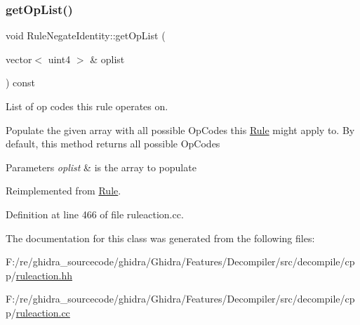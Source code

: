 \subsubsection{\texorpdfstring{getOpList()}{getOpList()}}
{\footnotesize\ttfamily void Rule\+Negate\+Identity\+::get\+Op\+List (\begin{DoxyParamCaption}\item[{vector$<$ uint4 $>$ \&}]{oplist }\end{DoxyParamCaption}) const\hspace{0.3cm}{\ttfamily [virtual]}}



List of op codes this rule operates on. 

Populate the given array with all possible Op\+Codes this \mbox{\hyperlink{class_rule}{Rule}} might apply to. By default, this method returns all possible Op\+Codes 
\begin{DoxyParams}{Parameters}
{\em oplist} & is the array to populate \\
\hline
\end{DoxyParams}


Reimplemented from \mbox{\hyperlink{class_rule_a4023bfc7825de0ab866790551856d10e}{Rule}}.



Definition at line 466 of file ruleaction.\+cc.



The documentation for this class was generated from the following files\+:\begin{DoxyCompactItemize}
\item 
F\+:/re/ghidra\+\_\+sourcecode/ghidra/\+Ghidra/\+Features/\+Decompiler/src/decompile/cpp/\mbox{\hyperlink{ruleaction_8hh}{ruleaction.\+hh}}\item 
F\+:/re/ghidra\+\_\+sourcecode/ghidra/\+Ghidra/\+Features/\+Decompiler/src/decompile/cpp/\mbox{\hyperlink{ruleaction_8cc}{ruleaction.\+cc}}\end{DoxyCompactItemize}
